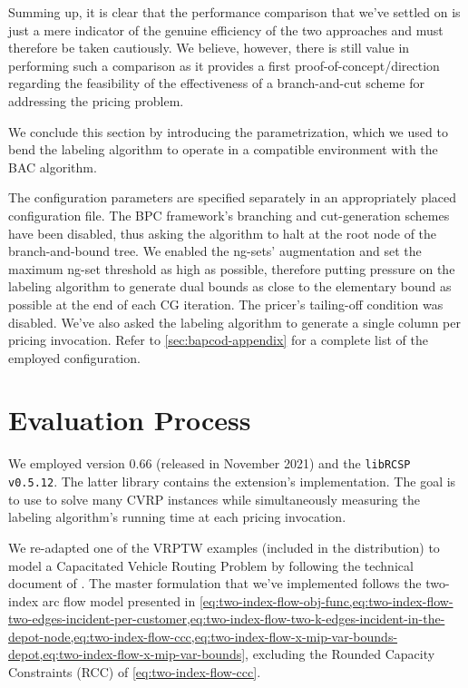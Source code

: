 Summing up, it is clear that the performance comparison that we've settled on is just
a mere indicator of the genuine efficiency of the two approaches and must
therefore be taken cautiously.
We believe, however, there is still value in performing such a comparison as it provides
a first proof-of-concept/direction regarding the feasibility of the effectiveness
of a branch-and-cut scheme for addressing the pricing problem.

\medskip

We conclude this section by introducing the \bapcod{} parametrization,
which we used to bend the labeling algorithm to operate in a compatible environment with the BAC algorithm.

The configuration parameters are specified separately
in an appropriately placed configuration file.
The BPC framework's branching and cut-generation schemes have been disabled,
thus asking the algorithm to halt at the root node of the branch-and-bound tree.
We enabled the ng-sets' augmentation and set the maximum ng-set threshold as high as possible,
therefore putting pressure on the labeling algorithm to generate dual bounds as close
to the elementary bound as possible at the end of each CG iteration.
The pricer's tailing-off condition was disabled.
We've also asked the labeling algorithm to generate
a single column per pricing invocation.
Refer to \cref{sec:bapcod-appendix} for a complete list of the employed configuration.

\section{Evaluation Process}
\label{sec:results-evaluation-process}

We employed \bapcod{} version 0.66 (released in November 2021) and the \texttt{libRCSP v0.5.12}.
The latter library contains the \vrpsolver{} extension's implementation.
The goal is to use \bapcod{} to solve many CVRP instances while simultaneously
measuring the labeling algorithm's running time at each pricing invocation.

\medskip

We re-adapted one of the VRPTW examples (included in the distribution)
to model a Capacitated Vehicle Routing Problem by following
the \bapcod{} technical document of \textcite{sadykov2021}.
The master formulation that we've implemented follows the two-index arc flow model
presented in \cref{eq:two-index-flow-obj-func,eq:two-index-flow-two-edges-incident-per-customer,eq:two-index-flow-two-k-edges-incident-in-the-depot-node,eq:two-index-flow-ccc,eq:two-index-flow-x-mip-var-bounds-depot,eq:two-index-flow-x-mip-var-bounds},
excluding the Rounded Capacity Constraints (RCC) of \cref{eq:two-index-flow-ccc}.

